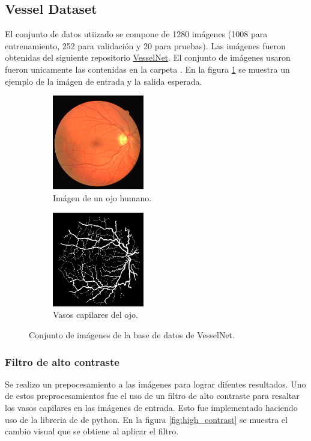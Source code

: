 \subsection{Vessel Dataset}

El conjunto de datos utiizado se compone de 1280 imágenes (1008 para entrenamiento, 252 para validación y 20 para pruebas). Las imágenes fueron obtenidas del siguiente repositorio \href{https://www.kaggle.com/datasets/srinjoybhuiya/VesselNet-code}{VesselNet}. El conjunto de imágenes usaron fueron unicamente las contenidas en la carpeta . En la figura \ref{fig:vesselnet} se muestra un ejemplo de la imágen de entrada y la salida esperada.

\begin{figure}[H]
    \centering
    \begin{subfigure}{6cm}
        \centering
        \includegraphics[width=4cm]{Graphics/train.jpg}
        \caption{Imágen de un ojo humano.}
    \end{subfigure}
    \begin{subfigure}{6cm}
        \centering
        \includegraphics[width=4cm]{Graphics/mask.png}
        \caption{Vasos capilares del ojo.}
    \end{subfigure}
    \caption{Conjunto de imágenes de la base de datos de VesselNet.}
    \label{fig:vesselnet}
\end{figure}

\subsubsection{Filtro de alto contraste}

Se realizo un prepocesamiento a las imágenes para lograr difentes resultados. Uno de estos preprocesamientos fue el uso de  un filtro de alto contraste para resaltar los vasos capilares en las imágenes de entrada. Esto fue implementado haciendo uso de la libreria de  de python. En la figura \ref{fig:high_contrast} se muestra el cambio visual que se obtiene al aplicar el filtro.

